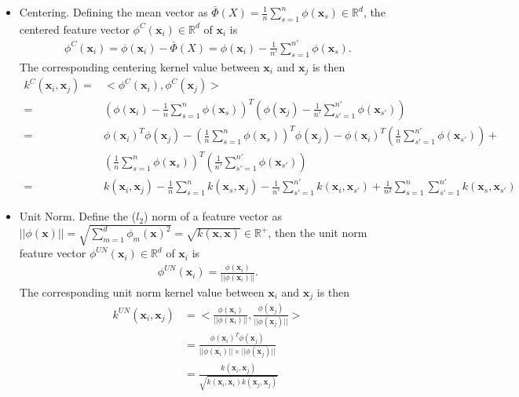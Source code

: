 \begin{itemize}
    \item Centering. 
    Defining the mean vector as $\bar{\Phi}(X) = \frac{1}{n} \sum_{s = 1}^n \phi(\mathbf{x}_s) \in \mathbb{R}^d$, the centered feature vector $\phi^C(\mathbf{x}_i) \in \mathbb{R}^d$ of $\mathbf{x}_i$ is
    \begin{align}
        \phi^{C}(\mathbf{x}_i) = \phi(\mathbf{x}_i) - \bar{\Phi}(X) = \phi(\mathbf{x}_i) - \frac{1}{n'} \sum_{s = 1}^{n'} \phi(\mathbf{x}_s).
    \end{align}
    The corresponding centering kernel value between $\mathbf{x}_i$ and $\mathbf{x}_j$ is then 
    \begin{align}
        k^C(\mathbf{x}_i, \mathbf{x}_j) =& <\phi^C(\mathbf{x}_i), \phi^C(\mathbf{x}_j)>\\
        =& \left( \phi(\mathbf{x}_i) - \frac{1}{n} \sum_{s = 1}^n \phi(\mathbf{x}_s)\right)^T \left( \phi(\mathbf{x}_j) - \frac{1}{n'} \sum_{s' = 1}^{n'} \phi(\mathbf{x}_{s'})\right)\\
        =& \phi(\mathbf{x}_i)^T \phi(\mathbf{x}_j) - \left( \frac{1}{n} \sum_{s = 1}^n \phi(\mathbf{x}_s)\right)^T \phi(\mathbf{x}_j) - \phi(\mathbf{x}_i)^T \left(\frac{1}{n} \sum_{s' = 1}^{n'} \phi(\mathbf{x}_{s'})\right) +\\
        &\left( \frac{1}{n} \sum_{s = 1}^n \phi(\mathbf{x}_s)\right)^T \left(\frac{1}{n'} \sum_{s' = 1}^{n'} \phi(\mathbf{x}_{s'})\right)\\
        =& k(\mathbf{x}_i, \mathbf{x}_j) - \frac{1}{n} \sum_{s=1}^n k(\mathbf{x}_s, \mathbf{x}_j) - \frac{1}{n'} \sum_{s'=1}^{n'} k(\mathbf{x}_i, \mathbf{x}_{s'}) + \frac{1}{n^2} \sum_{s = 1}^n \sum_{s'=1}^{n'} k(\mathbf{x}_s, \mathbf{x}_{s'})
    \end{align}
    
    \item Unit Norm. Define the ($l_2$) norm of a feature vector as $||\phi(\mathbf{x})|| = \sqrt{\sum_{m = 1}^d \phi_m(\mathbf{x})^2} = \sqrt{k(\mathbf{x}, \mathbf{x})} \in \mathbb{R}^+$, then the unit norm feature vector $\phi^{UN}(\mathbf{x}_i) \in \mathbb{R}^d$ of $\mathbf{x}_i$ is 
    \begin{align}
        \phi^{UN}(\mathbf{x}_i) = \frac{\phi(\mathbf{x}_i)}{||\phi(\mathbf{x}_i)||}.
    \end{align}
    The corresponding unit norm kernel value between $\mathbf{x}_i$ and $\mathbf{x}_j$ is then 
    \begin{align}
        k^{UN}(\mathbf{x}_i, \mathbf{x}_j) &= <\frac{\phi(\mathbf{x}_i)}{||\phi(\mathbf{x}_i)||}, \frac{\phi(\mathbf{x}_j)}{||\phi(\mathbf{x}_j)||}>\\
        &= \frac{\phi(\mathbf{x}_i)^T \phi(\mathbf{x}_j)}{||\phi(\mathbf{x}_i)|| \times ||\phi(\mathbf{x}_j)||}\\
        &= \frac{k(\mathbf{x}_i, \mathbf{x}_j)}{\sqrt{k(\mathbf{x}_i, \mathbf{x}_i)  k(\mathbf{x}_j, \mathbf{x}_j)}}
    \end{align}
    

\end{itemize}
